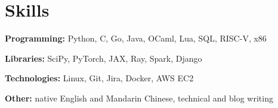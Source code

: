 \documentclass[letterpaper,11pt]{article}
\newcommand{\resumeSubHeadingListStart}{\begin{itemize}[leftmargin=0.15in, label={}]}
\newcommand{\resumeSubHeadingListEnd}{\end{itemize}}
\begin{document}
 
\section{Skills}
  \vspace{2pt}
  \resumeSubHeadingListStart
    \small{\item{
        \textbf{Programming: }{Python, C, Go, Java, OCaml, Lua, SQL, RISC-V, x86} \\ \vspace{3pt}
        
        \textbf{Libraries: }{SciPy, PyTorch, JAX, Ray, Spark, Django} \\ \vspace{3pt}
        
        \textbf{Technologies: }{Linux, Git, Jira, Docker, AWS EC2} \\ \vspace{3pt}

        \textbf{Other: }{native English and Mandarin Chinese, technical and blog writing}
    }}
  \resumeSubHeadingListEnd



\end{document}
